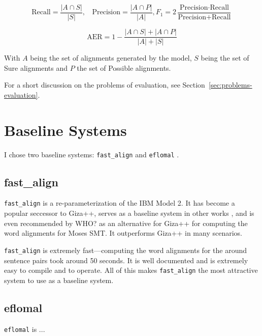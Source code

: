 \[
	\text{Recall} = \frac{|A\cap S|}{|S|},~~~~\text{Precision}  = \frac{|A\cap P|}{|A|}, F_1 = 2\frac{\text{Precision}\cdot\text{Recall}}{\text{Precision}+\text{Recall}}
\]

\[
	\text{AER} = 1- \frac{|A\cap S|+|A\cap P|}{|A|+|S|}
\]

With $A$ being the set of alignments generated by the model, $S$ being the set of Sure alignments and $P$ the set of Possible alignments.

For a short discussion on the problems of evaluation, see Section~\ref{sec:problems-evaluation}.




\section{Baseline Systems}
I chose two baseline systems: \texttt{fast\_align} \autocite{dyer-etal-2013-simple} and \texttt{eflomal} \autocite{Ostling2016efmaral}.

\subsection{fast\_align}
\texttt{fast\_align} is a re-parameterization of the IBM Model 2. 
It has become a popular seccessor to Giza++, serves as a baseline system in other works \autocites{Ostling2016efmaral,jalili-sabet-etal-2020-simalign}, and is even recommended by WHO? as an alternative for Giza++ for computing the word alignments for Moses SMT. 
It outperforms Giza++ in many scenarios.

\texttt{fast\_align} is extremely fast---computing the word alignments for the around  sentence pairs took around 50 seconds. 
It is well documented and is extremely easy to compile and to operate. 
All of this makes \texttt{fast\_align} the most attractive system to use as a baseline system.

\subsection{eflomal}
\texttt{eflomal} is ... 



